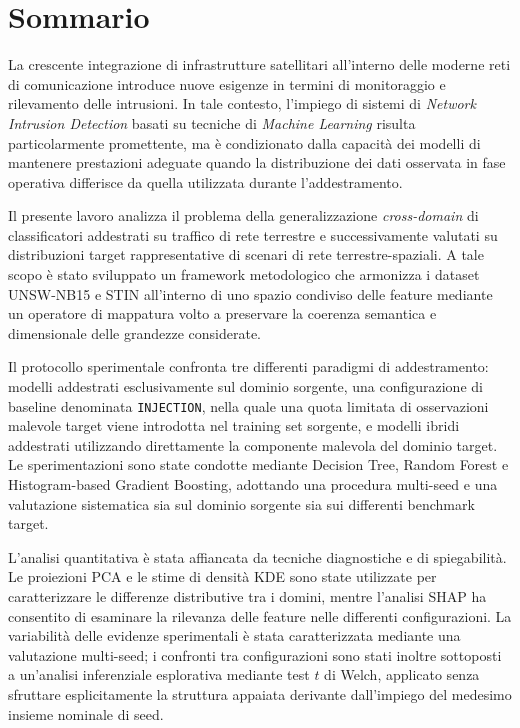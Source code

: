 \chapter*{Sommario}

La crescente integrazione di infrastrutture satellitari all'interno delle moderne reti di comunicazione introduce nuove esigenze in termini di monitoraggio e rilevamento delle intrusioni. 
In tale contesto, l'impiego di sistemi di \textit{Network Intrusion Detection} basati su tecniche di \textit{Machine Learning} risulta particolarmente promettente, ma è condizionato dalla capacità dei modelli di mantenere prestazioni adeguate quando la distribuzione dei dati osservata in fase operativa differisce da quella utilizzata durante l'addestramento.

Il presente lavoro analizza il problema della generalizzazione \textit{cross-domain} di classificatori addestrati su traffico di rete terrestre e successivamente valutati su distribuzioni target rappresentative di scenari di rete terrestre-spaziali.
A tale scopo è stato sviluppato un framework metodologico che armonizza i dataset UNSW-NB15 e STIN all'interno di uno spazio condiviso delle feature mediante un operatore di mappatura volto a preservare la coerenza semantica e dimensionale delle grandezze considerate.

Il protocollo sperimentale confronta tre differenti paradigmi di addestramento: modelli addestrati esclusivamente sul dominio sorgente, una configurazione di baseline denominata \texttt{INJECTION}, nella quale una quota limitata di osservazioni malevole target viene introdotta nel training set sorgente, e modelli ibridi addestrati utilizzando direttamente la componente malevola del dominio target. 
Le sperimentazioni sono state condotte mediante Decision Tree, Random Forest e Histogram-based Gradient Boosting, adottando una procedura multi-seed e una valutazione sistematica sia sul dominio sorgente sia sui differenti benchmark target.

L'analisi quantitativa è stata affiancata da tecniche diagnostiche e di spiegabilità. 
Le proiezioni PCA e le stime di densità KDE sono state utilizzate per caratterizzare le differenze distributive tra i domini, mentre l'analisi SHAP ha consentito di esaminare la rilevanza delle feature nelle differenti configurazioni. 
La variabilità delle evidenze sperimentali è stata caratterizzata mediante una valutazione multi-seed; i confronti tra configurazioni sono stati inoltre sottoposti a un'analisi inferenziale esplorativa mediante test $t$ di Welch, applicato senza sfruttare esplicitamente la struttura appaiata derivante dall'impiego del medesimo insieme nominale di seed.


